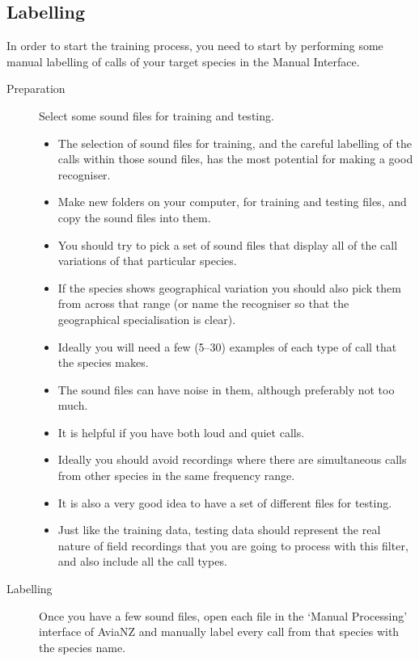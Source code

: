 \documentclass{article}
\begin{document}
\subsection{Labelling}

In order to start the training process, you need to start by performing some manual labelling of calls of your target species in the Manual Interface.

\begin{description}
\item[Preparation] Select some sound files for training and testing. 
\begin{itemize}
\item The selection of sound files for training, and the careful labelling of the calls within those sound files, has the most potential for making a good recogniser. 
\item Make new folders on your computer, for training and testing files, and copy the sound files into them.
\item You should try to pick a set of sound files that display all of the call variations of that particular species. 
\item If the species shows geographical variation you should also pick them from across that range (or name the recogniser so that the geographical specialisation is clear).  
\item Ideally you will need a few (5--30) examples of each type of call that the species makes. 
\item The sound files can have noise in them, although preferably not too much. 
\item It is helpful if you have both loud and quiet calls. 
\item Ideally you should avoid recordings where there are simultaneous calls from other species in the same frequency range. 
\item It is also a very good idea to have a set of different files for testing. %
\item Just like the training data, testing data should represent the real nature of field recordings that you are going to process with this filter, and also include all the call types.
\end{itemize}
\item[Labelling] Once you have a few sound files, open each file in the `Manual Processing' interface of AviaNZ and manually label every call from that species with the species name.

\end{description}
\end{document}
